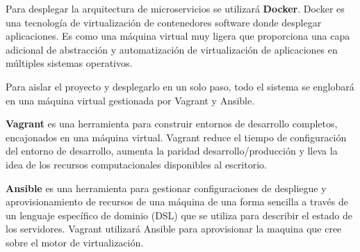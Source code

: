 \documentclass[../main.tex]{subfiles}
\begin{document}
Para desplegar la arquitectura de microservicios se utilizará \textbf{Docker}. Docker es una tecnología de virtualización de contenedores software donde desplegar aplicaciones. Es como una máquina virtual muy ligera que proporciona una capa adicional de abstracción y automatización de virtualización de aplicaciones en múltiples sistemas operativos.\cite{}

Para aislar el proyecto y desplegarlo en un solo paso, todo el sistema se englobará en una máquina virtual gestionada por Vagrant y Ansible.

\textbf{Vagrant} es una herramienta para construir entornos de desarrollo completos, encajonados en una máquina virtual. Vagrant reduce el tiempo de configuración del entorno de desarrollo, aumenta la paridad desarrollo/producción y lleva la idea de los recursos computacionales disponibles al escritorio.\cite{}

\textbf{Ansible} es una herramienta para gestionar configuraciones de despliegue y aprovisionamiento de recursos de una máquina de una forma sencilla a través de un lenguaje específico de dominio (DSL) que se utiliza para describir el estado de los servidores\cite{}. Vagrant utilizará Ansible para aprovisionar la maquina que cree sobre el motor de virtualización.
\end{document}
